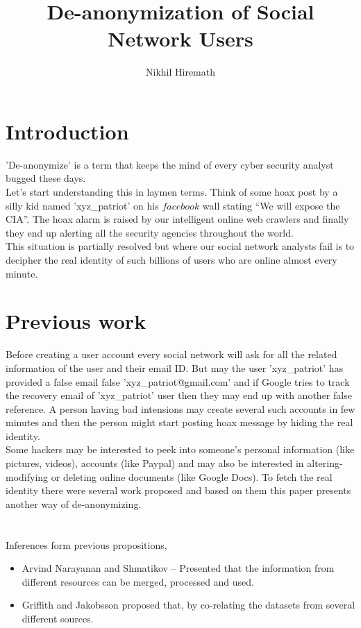 \documentclass{article}
\title{De-anonymization of Social Network Users}
\author{Nikhil Hiremath}
\begin{document}
\maketitle

\section*{Introduction}
'De-anonymize' is a term that keeps the mind of every cyber security analyst bugged these days.\\

Let's start understanding this in laymen terms. Think of some hoax post by a silly kid named 'xyz\_patriot' on his $facebook$ wall stating \enquote{We will expose the CIA}. The hoax alarm is raised by our intelligent online web crawlers and finally they end up alerting all the security agencies throughout the world.\\

This situation is partially resolved but where our social network analysts fail is to decipher the real identity of such billions of users who are online almost every minute.\\

\section*{Previous work}
Before creating a user account every social network will ask for all the related information of the user and their email ID. But may the user 'xyz\_patriot' has provided a false email false 'xyz\_patriot@gmail.com' and if Google tries to track the recovery email of 'xyz\_patriot' user then they may end up with another false reference. A person having bad intensions may create several such accounts in few minutes and then the person might start posting hoax message by hiding the real identity.\\

Some hackers may be interested to peek into someone's personal information (like pictures, videos), accounts (like Paypal) and may also be interested in altering-modifying or deleting online documents (like Google Docs). To fetch the real identity there were several work proposed and based on them this paper presents another way of de-anonymizing.\\
\\
\\
Inferences form previous propositions,\\
\begin{itemize}
\item Arvind Narayanan and Shmatikov – Presented that the information from different resources can be merged, processed and used.\\
\item Griffith and Jakobsson proposed that, by co-relating the datasets from several different sources.\\
\end{itemize}
\end{document}
